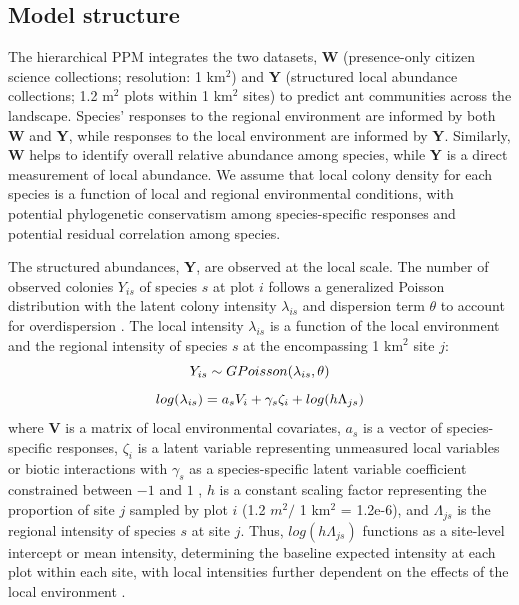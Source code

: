\documentclass[preprint,review,times,12pt]{elsarticle}
\begin{document}
\subsection{Model structure}
The hierarchical PPM integrates the two datasets, \textbf{W} (presence-only citizen science collections; resolution: 1 km$^2$) and \textbf{Y} (structured local abundance collections; 1.2 m$^2$ plots within 1 km$^2$ sites) to predict ant communities across the landscape. Species' responses to the regional environment are informed by both \textbf{W} and \textbf{Y}, while responses to the local environment are informed by \textbf{Y}. Similarly, \textbf{W} helps to identify overall relative abundance among species, while \textbf{Y} is a direct measurement of local abundance. We assume that local colony density for each species is a function of local and regional environmental conditions, with potential phylogenetic conservatism among species-specific responses and potential residual correlation among species.

The structured abundances, \textbf{Y}, are observed at the local scale. The number of observed colonies $Y_{is}$ of species $s$ at plot $i$ follows a generalized Poisson distribution with the latent colony intensity $\lambda_{is}$ and dispersion term $\theta$ to account for overdispersion \citep{Consul1992,Ntzoufras2005,Isaac2019,Miller2019}. The local intensity $\lambda_{is}$ is a function of the local environment and the regional intensity of species $s$ at the encompassing 1 km$^2$ site $j$:
    \begin{equation}
        Y_{is} \sim GPoisson(\lambda_{is}, \theta) \\
        \label{eq:Y_GP}
    \end{equation}
    \begin{equation}
        log(\lambda_{is}) = a_s V_i + \gamma_s \zeta_i + log(h\Lambda_{js}) \\
        \label{eq:lambda}
    \end{equation}
where \textbf{V} is a matrix of local environmental covariates, $a_s$ is a vector of species-specific responses, $\zeta_i$ is a latent variable representing unmeasured local variables or biotic interactions with $\gamma_s$ as a species-specific latent variable coefficient constrained between $-1$ and $1$ \citep{Ovaskainen2016,Caradima2019,Tobler2019}, $h$ is a constant scaling factor representing the proportion of site $j$ sampled by plot $i$ (1.2 $m^2 /$ 1 km$^2$ = 1.2e-6), and $\Lambda_{js}$ is the regional intensity of species $s$ at site $j$. Thus, $log(h\Lambda_{js})$ functions as a site-level intercept or mean intensity, determining the baseline expected intensity at each plot within each site, with local intensities further dependent on the effects of the local environment \citep{Yamaura2016,Miller2019}.
\end{document}
